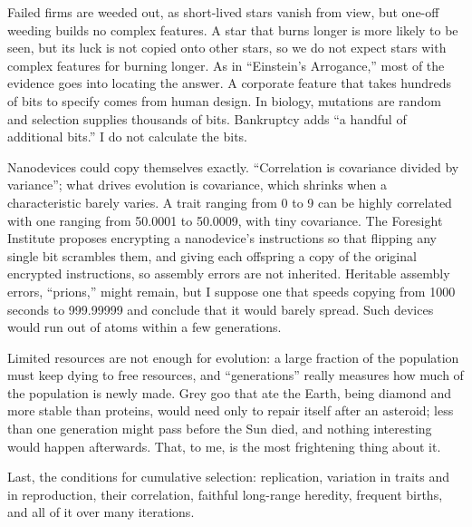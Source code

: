 Failed firms are weeded out, as short-lived stars vanish from view, but one-off weeding builds no complex features. A star that burns longer is more likely to be seen, but its luck is not copied onto other stars, so we do not expect stars with complex features for burning longer. As in ``Einstein's Arrogance,'' most of the evidence goes into locating the answer. A corporate feature that takes hundreds of bits to specify comes from human design. In biology, mutations are random and selection supplies thousands of bits. Bankruptcy adds ``a handful of additional bits.'' I do not calculate the bits.

Nanodevices could copy themselves exactly. ``Correlation is covariance divided by variance''; what drives evolution is covariance, which shrinks when a characteristic barely varies. A trait ranging from 0 to 9 can be highly correlated with one ranging from 50.0001 to 50.0009, with tiny covariance.  The Foresight Institute proposes encrypting a nanodevice's instructions so that flipping any single bit scrambles them, and giving each offspring a copy of the original encrypted instructions, so assembly errors are not inherited. Heritable assembly errors, ``prions,'' might remain, but I suppose one that speeds copying from 1000 seconds to 999.99999 and conclude that it would barely spread. Such devices would run out of atoms within a few generations.

Limited resources are not enough for evolution: a large fraction of the population must keep dying to free resources, and ``generations'' really measures how much of the population is newly made. Grey goo that ate the Earth, being diamond and more stable than proteins, would need only to repair itself after an asteroid; less than one generation might pass before the Sun died, and nothing interesting would happen afterwards. That, to me, is the most frightening thing about it.

Last, the conditions for cumulative selection: replication, variation in traits and in reproduction, their correlation, faithful long-range heredity, frequent births, and all of it over many iterations. 
